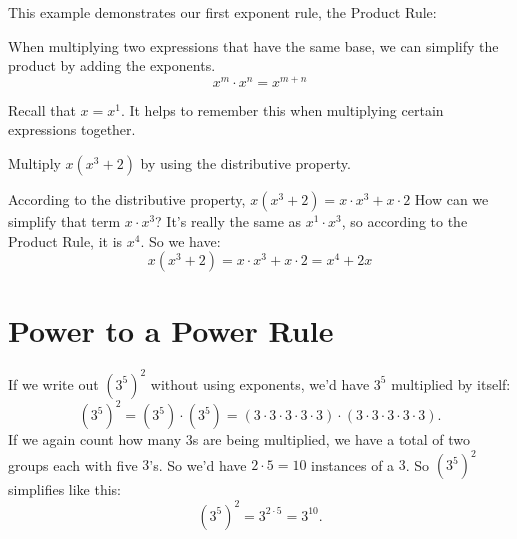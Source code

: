 \documentclass{ximera}
\begin{document}
      This example demonstrates our first exponent rule,
      the Product Rule:\\
\begin{theorem}
      When multiplying two expressions that have the same base,
      we can simplify the product by adding the exponents.
        $$
x^m \cdot x^n = x^{m+n}
$$
\end{theorem}
   Recall that $x=x^1$. It helps to remember this when multiplying certain expressions together.
\begin{example}        
  Multiply $x(x^3+2)$ by using the distributive property.\\
\begin{explanation}
          According to the distributive property,
        $x(x^3+2)=x\cdot x^3 + x\cdot2$
          How can we simplify that term $x\cdot x^3$?
          It's really the same as $x^1\cdot x^3$,
          so according to the Product Rule, it is $x^4$.
          So we have:
        $$
            x(x^3+2)=x\cdot x^3 + x\cdot2
            =x^4+2x
$$
\end{explanation}
\end{example}         

 \section{Power to a Power Rule}

        If we write out $\left(3^5\right)^2$ without using exponents,
        we'd have $3^5$ multiplied by itself:
   $$
         \left(3^5\right)^2 = \left(3^5\right)\cdot \left(3^5\right)
         = \left(3\cdot 3\cdot 3\cdot 3 \cdot 3 \right) \cdot \left(3 \cdot 3\cdot 3\cdot 3\cdot 3\right).
      $$ 
        If we again count how many $3$s are being multiplied,
        we have a total of two groups each with five $3$'s.
        So we'd have $2\cdot 5=10$ instances of a $3$.
        So $\left(3^5\right)^2$ simplifies like this:
   \begin{equation*}
          \left(3^5\right)^2 = 3^{2\cdot 5}
          = 3^{10}.
          \end{equation*}
\end{document}
